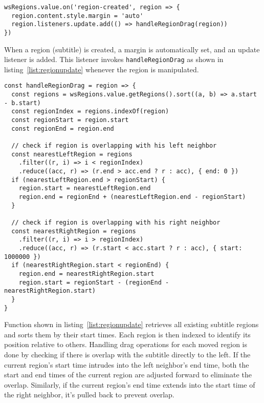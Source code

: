 \begin{clisting}
\label{list:regiondrag}
\begin{verbatim}
wsRegions.value.on('region-created', region => {
  region.content.style.margin = 'auto'
  region.listeners.update.add(() => handleRegionDrag(region))
})
\end{verbatim}
\end{clisting}

When a region (subtitle) is created, a margin is automatically set, and an update listener is added. This listener invokes \texttt{handleRegionDrag} as shown in listing~\ref{list:regionupdate} whenever the region is manipulated.

\begin{clisting}
\label{list:regionupdate}
\begin{verbatim}
const handleRegionDrag = region => {
  const regions = wsRegions.value.getRegions().sort((a, b) => a.start - b.start)
  const regionIndex = regions.indexOf(region)
  const regionStart = region.start
  const regionEnd = region.end

  // check if region is overlapping with his left neighbor
  const nearestLeftRegion = regions
    .filter((r, i) => i < regionIndex)
    .reduce((acc, r) => (r.end > acc.end ? r : acc), { end: 0 })
  if (nearestLeftRegion.end > regionStart) {
    region.start = nearestLeftRegion.end
    region.end = regionEnd + (nearestLeftRegion.end - regionStart)
  }

  // check if region is overlapping with his right neighbor
  const nearestRightRegion = regions
    .filter((r, i) => i > regionIndex)
    .reduce((acc, r) => (r.start < acc.start ? r : acc), { start: 1000000 })
  if (nearestRightRegion.start < regionEnd) {
    region.end = nearestRightRegion.start
    region.start = regionStart - (regionEnd - nearestRightRegion.start)
  }
}
\end{verbatim}
\end{clisting}

Function shown in listing~\ref{list:regionupdate} retrieves all existing subtitle regions and sorts them by their start times. Each region is then indexed to identify its position relative to others. Handling drag operations for each moved region is done by checking if there is overlap with the subtitle directly to the left. If the current region's start time intrudes into the left neighbor's end time, both the start and end times of the current region are adjusted forward to eliminate the overlap. Similarly, if the current region's end time extends into the start time of the right neighbor, it's pulled back to prevent overlap.

